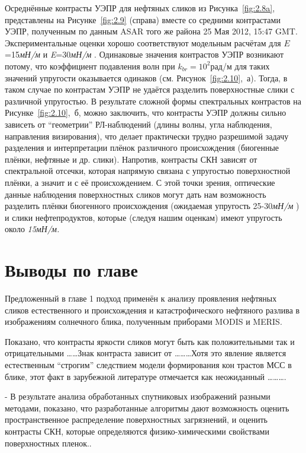Осреднённые контрасты УЭПР для нефтяных сликов из Рисунка~\ref{fig:2.8a}, представлены на Рисунке~\ref{fig:2.9} (справа) вместе со средними контрастами УЭПР, полученным по данным ASAR того же района 25 Мая 2012, 15:47 GMT. Экспериментальные оценки хорошо соответствуют модельным расчётам для $E$=15\textit{мН/м }и \textit{E}=30\textit{мН/м }. Одинаковые значения контрастов УЭПР возникают потому, что коэффициент подавления волн при $k_{br} =10^{2} $рад/м для таких значений упругости оказывается одинаков (см. Рисунок~\ref{fig:2.10},~а). Тогда, в таком случае по контрастам УЭПР не удаётся разделить поверхностные слики с различной упругостью. В результате сложной формы спектральных контрастов на Рисунке~\ref{fig:2.10},~б, можно заключить, что контрасты УЭПР должны сильно зависеть от ``геометрии'' РЛ-наблюдений (длины волны, угла наблюдения, направления визирования), что делает практически трудно разрешимой задачу разделения и интерпретации плёнок различного происхождения (биогенные плёнки, нефтяные и др. слики). Напротив, контрасты СКН зависят от спектральной отсечки, которая напрямую связана с упругостью поверхностной плёнки, а значит и с её происхождением. С этой точки зрения, оптические данные наблюдения поверхностных сликов могут дать нам возможность разделить плёнки биогенного происхождения (ожидаемая упругость 25-30\textit{мН/м }) и слики нефтепродуктов, которые (следуя нашим оценкам) имеют упругость около \textit{15мН/м.} 



\newpage



\section{Выводы по главе}



Предложенный в главе 1 подход применён к анализу проявления нефтяных сликов естественного и происхождения и катастрофического нефтяного разлива в изображениям солнечного блика, полученным приборами MODIS и MERIS. 

Показано, что контрасты яркости сликов могут быть как положительными так и отрицательными \dots \dots Знак контраста зависит от \dots \dots \dots  Хотя это явление является естественным ``строгим'' следствием модели формирования кон трастов МСС в блике, этот факт в зарубежной литературе отмечается как неожиданный \dots \dots \dots .

- В результате анализа обработанных спутниковых изображений разными методами, показано, что разработанные алгоритмы дают возможность оценить пространственное распределение поверхностных загрязнений, и оценить контрасты СКН, которые определяются физико-химическими свойствами поверхностных пленок..

